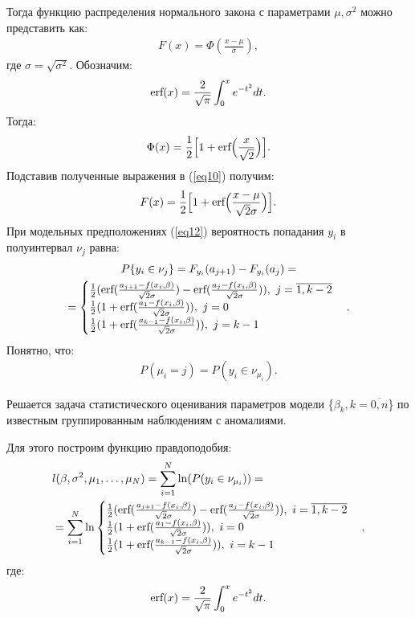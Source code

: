 Тогда функцию распределения нормального закона с параметрами $\mu,\sigma^2$ можно представить как:
\begin{eqnarray}
    \label{eq10}F(x)=\Phi(\frac{x-\mu}{\sigma}),
\end{eqnarray}
где $\sigma = \sqrt{\sigma^2}$. \hfill\break
Обозначим:
\begin{eqnarray}
    \textup{erf}(x)=\frac{2}{\sqrt{\pi}}\int_0^{x}e^{-t^2}dt.
\end{eqnarray}
Тогда:
\begin{eqnarray}
    \Phi(x)= \frac{1}{2} \Big[1+\textup{erf}\Big(\frac{x}{\sqrt{2}} \Big) \Big].
\end{eqnarray}
Подставив полученные выражения в (\ref{eq10}) получим:
\begin{eqnarray}
    F(x)= \frac{1}{2} \Big[1+\textup{erf}\Big(\frac{x-\mu}{\sqrt{2}\sigma} \Big) \Big].
\end{eqnarray}
При модельных предположениях (\ref{eq12}) вероятность попадания $y_i$ в полуинтервал $\nu_j$ равна:
\begin{multline}
    P\{y_i\in\nu_j\}= F_{y_i}(a_{j+1})-F_{y_i}(a_{j})=\\
    =\begin{cases}
        \frac{1}{2}(\textup{erf}(\frac{a_{j+1}-f(x_i,\beta)}{\sqrt{2}\sigma})-\textup{erf}(\frac{a_{j}-f(x_i,\beta)}{\sqrt{2}\sigma})),~j=\overline{1,k-2}\\
        \frac{1}{2}(1+\textup{erf}(\frac{a_{1}-f(x_i,\beta)}{\sqrt{2}\sigma})),~j=0\\
        \frac{1}{2}(1+\textup{erf}(\frac{a_{k-1}-f(x_i,\beta)}{\sqrt{2}\sigma})),~j=k-1
    \end{cases}.
\end{multline}
Понятно, что:
\begin{eqnarray}
    P(\mu_i=j)=P(y_i\in \nu_{\mu_i}).
\end{eqnarray}

Решается задача статистического оценивания параметров модели \{$\beta_k, k=\overline{0,n}$\} по известным группированным наблюдениям с аномалиями.

Для этого построим функцию правдоподобия:
\begin{eqnarray}
    \label{eq22}\label{eq23}&l(\beta,\sigma^2, \mu_1,\dots, \mu_{N})=\sum\limits_{i=1}^{N}\ln(P(y_i\in \nu_{\mu_i}))=\\
    &=\sum\limits_{i=1}^{N}\ln\begin{cases}
        \frac{1}{2}(\textup{erf}(\frac{a_{j+1}-f(x_i,\beta)}{\sqrt{2}\sigma})-\textup{erf}(\frac{a_{j}-f(x_i,\beta)}{\sqrt{2}\sigma})),~i=\overline{1,k-2}\\
        \frac{1}{2}(1+\textup{erf}(\frac{a_{1}-f(x_i,\beta)}{\sqrt{2}\sigma})),~i=0\\
        \frac{1}{2}(1+\textup{erf}(\frac{a_{k-1}-f(x_i,\beta)}{\sqrt{2}\sigma})),~i=k-1
    \end{cases},
\end{eqnarray}
где:
\begin{eqnarray}
    \textup{erf}(x)=\frac{2}{\sqrt{\pi}}\int_0^{x}e^{-t^2}dt.
\end{eqnarray}

